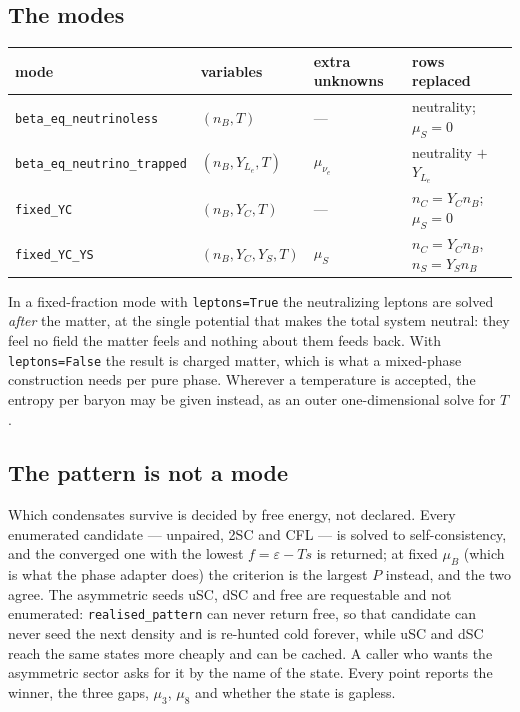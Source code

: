 \documentclass[aps,prc,onecolumn,superscriptaddress,nofootinbib,10pt]{revtex4-2}
\newcommand{\nB}{n_B}
\newcommand{\nC}{n_C}
\newcommand{\nS}{n_S}
\newcommand{\muB}{\mu_B}
\newcommand{\muS}{\mu_S}
\newcommand{\munue}{\mu_{\nu_e}}
\begin{document}
\subsection{The modes}

\begin{center}
\begin{tabular}{llll}
\toprule
mode & variables & extra unknowns & rows replaced \\
\midrule
\texttt{beta\_eq\_neutrinoless} & $(\nB,T)$ & --- & neutrality; $\muS = 0$ \\
\texttt{beta\_eq\_neutrino\_trapped} & $(\nB, Y_{L_e}, T)$ & $\munue$ & neutrality $+$ $Y_{L_e}$ \\
\texttt{fixed\_YC} & $(\nB, Y_C, T)$ & --- & $\nC = Y_C \nB$; $\muS = 0$ \\
\texttt{fixed\_YC\_YS} & $(\nB, Y_C, Y_S, T)$ & $\muS$ & $\nC = Y_C \nB$, $\nS = Y_S \nB$ \\
\bottomrule
\end{tabular}
\end{center}
In a fixed-fraction mode with \texttt{leptons=True} the neutralizing leptons are
solved \emph{after} the matter, at the single potential that makes the total
system neutral: they feel no field the matter feels and nothing about them
feeds back. With \texttt{leptons=False} the result is charged matter, which is
what a mixed-phase construction needs per pure phase. Wherever a temperature is
accepted, the entropy per baryon may be given instead, as an outer
one-dimensional solve for $T$.

\subsection{The pattern is not a mode}
\label{sec:enumeration}

Which condensates survive is decided by free energy, not declared. Every
enumerated candidate --- unpaired, 2SC and CFL --- is solved to
self-consistency, and the converged one with the lowest $f = \varepsilon - Ts$
is returned; at fixed $\muB$ (which is what the phase adapter does) the
criterion is the largest $P$ instead, and the two agree. The asymmetric seeds
uSC, dSC and free are requestable and not enumerated: \texttt{realised\_pattern}
can never return free, so that candidate can never seed the next density and is
re-hunted cold forever, while uSC and dSC reach the same states more cheaply
and can be cached. A caller who wants the asymmetric sector asks for it by the
name of the state. Every point reports
the winner, the three gaps, $\mu_3$, $\mu_8$ and whether the state is gapless.
\end{document}
